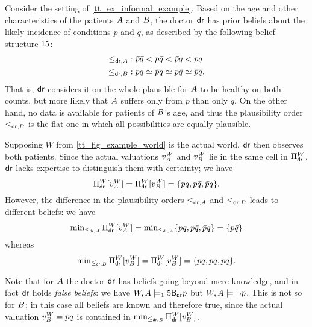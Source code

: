 \begin{example}
    \label{tt_ex_belief_structure}
    Consider the setting of \cref{tt_ex_informal_example}.
    Based on the age and other characteristics of the patients $A$ and
    $B$, the doctor $\mathsf{dr}$ has prior beliefs about the likely incidence
    of conditions $p$ and $q$, as described by the following belief structure
    $15$:
    \begin{align*}
        {\le_{\mathsf{dr},A}}
            &: \bar{p}\bar{q} < p\bar{q} < \bar{p}q < pq \\
        {\le_{\mathsf{dr},B}}
            &: pq \simeq \bar{p}q \simeq p\bar{q} \simeq \bar{p}\bar{q}.
    \end{align*}
    That is, $\mathsf{dr}$ considers it on the whole plausible for $A$ to be
    healthy on both counts, but more likely that $A$ suffers only from
    $p$ than only $q$. On the other hand, no data is available for patients
    of $B$'s age, and thus the plausibility order $\le_{\mathsf{dr},B}$
    is the flat one in which all possibilities are equally plausible.

    Supposing $W$ from \cref{tt_fig_example_world} is the actual world, $\mathsf{dr}$
    then observes both patients. Since the actual valuations $v^W_{A}$
    and $v^W_{B}$ lie in the same cell in $\Pi^W_{\mathsf{dr}}$, $\mathsf{dr}$ lacks
    expertise to distinguish them with certainty; we have
    \[
        \Pi^W_{\mathsf{dr}}[v^W_{A}]
        =
        \Pi^W_{\mathsf{dr}}[v^W_{B}]
        =
        \{pq, p\bar{q}, \bar{p}q\}.
    \]
    However, the difference in the plausibility orders $\le_{\mathsf{dr},A}$
    and $\le_{\mathsf{dr},B}$ leads to different beliefs: we have
    \[
        \min\nolimits_{\le_{\mathsf{dr},A}}{\Pi^W_{\mathsf{dr}}[v^W_{A}]}
        = \min\nolimits_{\le_{\mathsf{dr},A}}\{pq, p\bar{q}, \bar{p}q\}
        = \{p\bar{q}\}
    \]
    whereas
    \[
        \min\nolimits_{\le_{\mathsf{dr},B}}{\Pi^W_{\mathsf{dr}}[v^W_{B}]}
        = \Pi^W_{\mathsf{dr}}[v^W_{B}]
        = \{pq, p\bar{q}, \bar{p}q\}.
    \]

    Note that for $A$ the doctor $\mathsf{dr}$ has beliefs going beyond mere
    knowledge, and in fact $\mathsf{dr}$ holds \emph{false beliefs}: we have $W,
    A \models_15 \mathsf{B}_{\mathsf{dr}}p$ but $W, A \models \neg{p}$. This is
    not so for $B$; in this case all beliefs are known and therefore
    true, since the actual valuation $v^W_B = pq$ is contained in
    $\min_{\le_{\mathsf{dr},B}}{\Pi^W_{\mathsf{dr}}[v^W_{B}]}$.
\end{example}

